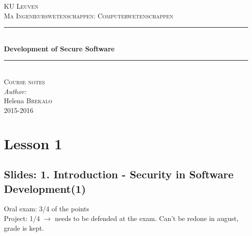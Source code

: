 \documentclass[10pt,a4paper]{report}
\author{Helena Brekalo}
\begin{document}
\begin{titlepage}

\newcommand{\HRule}{\rule{\linewidth}{0.5mm}} %

\center %
 
\textsc{\LARGE KU Leuven}\\[1.5cm] %
\textsc{\Large Ma Ingenieurswetenschappen: Computerwetenschappen}\\[0.5cm] %


\HRule \\[0.4cm]
{ \huge \bfseries Development of Secure Software}\\[0.4cm]
\HRule \\[1.5cm]


\textsc{\large Course notes}\\[0.5cm] %


\Large \emph{Author:}\\
Helena \textsc{Brekalo}\\[3cm]

{\large 2015-2016}\\[3cm] %

\vfill %

\end{titlepage}

\tableofcontents
\clearpage

\chapter{Lesson 1}

\section{Slides: 1. Introduction - Security in Software Development(1)}

Oral exam: 3/4 of the points\\
Project: 1/4 $\rightarrow$ needs to be defended at the exam. Can't be redone in august, grade is kept.
\end{document}
